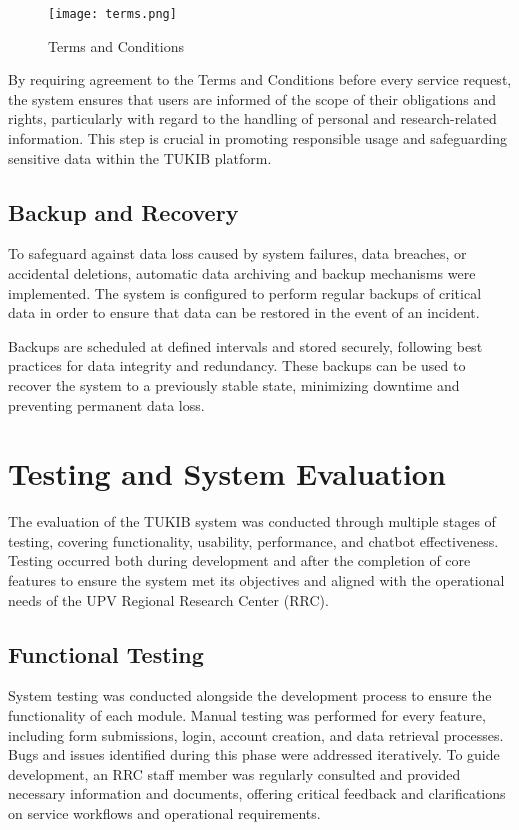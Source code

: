 \begin{figure}[h]
	\centering
	\texttt{[image: terms.png]}
	\caption{Terms and Conditions}
	\label{fig:terms}
\end{figure}

By requiring agreement to the Terms and Conditions before every service request, the system ensures that users are informed of the scope of their obligations and rights, particularly with regard to the handling of personal and research-related information. This step is crucial in promoting responsible usage and safeguarding sensitive data within the TUKIB platform.

\subsection{Backup and Recovery}

To safeguard against data loss caused by system failures, data breaches, or accidental deletions, automatic data archiving and backup mechanisms were implemented. The system is configured to perform regular backups of critical data in order to ensure that data can be restored in the event of an incident.

Backups are scheduled at defined intervals and stored securely, following best practices for data integrity and redundancy. These backups can be used to recover the system to a previously stable state, minimizing downtime and preventing permanent data loss. 

\section{Testing and System Evaluation}

The evaluation of the TUKIB system was conducted through multiple stages of testing, covering functionality, usability, performance, and chatbot effectiveness. Testing occurred both during development and after the completion of core features to ensure the system met its objectives and aligned with the operational needs of the UPV Regional 
Research Center (RRC).

\subsection{Functional Testing}

System testing was conducted alongside the development process to ensure the functionality of each module. Manual testing was performed for every feature, including form submissions, login, account creation, and data retrieval processes. Bugs and issues identified during this phase were addressed iteratively. To guide development, an RRC staff member was regularly consulted and provided necessary information and documents, offering critical feedback and clarifications on service workflows and operational requirements.

